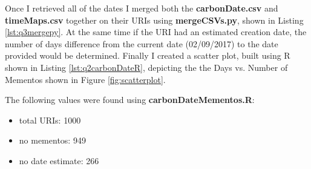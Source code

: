 \documentclass[letterpaper,11pt]{article}
\newcommand*{\srcPath}{../src}%
\begin{document}
Once I retrieved all of the dates I merged both the \textbf{carbonDate.csv} and \textbf{timeMaps.csv} together on their URIs using \textbf{mergeCSVs.py}, shown in Listing \ref{lst:q3mergepy}. At the same time if the URI had an estimated creation date, the number of days difference from the current date (02/09/2017) to the date provided would be determined. Finally I created a scatter plot, built using R shown in Listing \ref{lst:q2carbonDateR}, depicting the the Days vs. Number of Mementos shown in Figure \ref{fig:scatterplot}.

The following values were found using \textbf{carbonDateMementos.R}:
\begin{itemize}
  \item total URIs:	     1000
  \item no mementos:      949
  \item no date estimate: 266
\end{itemize}




\end{document}
